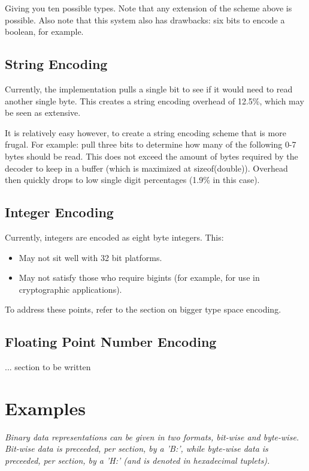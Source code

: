 Giving you ten possible types. Note that any extension of the scheme
above is possible. Also note that this system also has drawbacks:
six bits to encode a boolean, for example.

\subsection{String Encoding}

Currently, the implementation pulls a single bit to see if it would need
to read another single byte. This creates a string encoding overhead of
12.5\%, which may be seen as extensive.

It is relatively easy however, to create a string encoding scheme that
is more frugal. For example: pull three bits to determine how many of the
following 0-7 bytes should be read. This does not exceed the amount of
bytes required by the decoder to keep in a buffer (which is maximized at
sizeof(double)). Overhead then quickly drops to low
single digit percentages (1.9\% in this case).

\subsection{Integer Encoding}

Currently, integers are encoded as eight byte integers. This:

\begin{itemize}
\item May not sit well with 32 bit platforms.
\item May not satisfy those who require bigints (for example, for use in
      cryptographic applications).
\end{itemize}

To address these points, refer to the section on bigger type space
encoding.

\subsection{Floating Point Number Encoding}

... section to be written

\section{Examples}

\textit{
Binary data representations can be given in two formats, bit-wise and byte-wise.
Bit-wise data is preceeded, per section, by a 'B:',
while byte-wise data is preceeded, per section, by a 'H:' (and is denoted in
hexadecimal tuplets).
}

